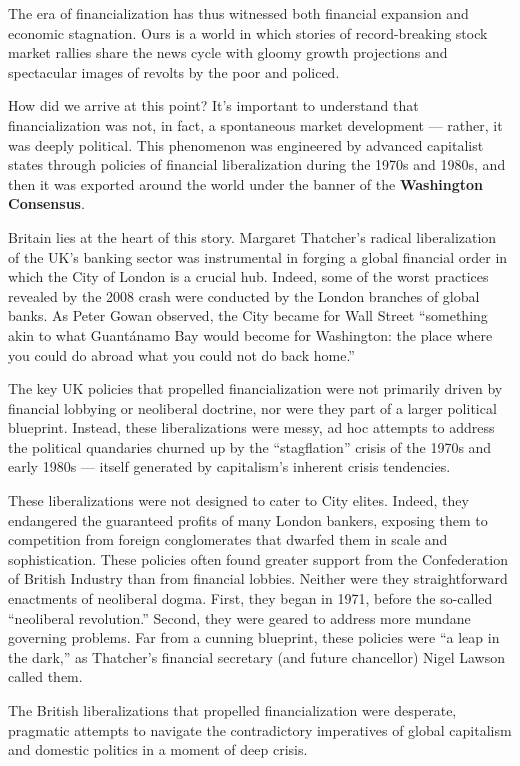 \documentclass[
]{book}
\begin{document}
The era of financialization has thus witnessed both financial expansion and economic stagnation. Ours is a world in which stories of record-breaking stock market rallies share the news cycle with gloomy growth projections and spectacular images of revolts by the poor and policed.

How did we arrive at this point? It's important to understand that financialization was not, in fact, a spontaneous market development --- rather, it was deeply political. This phenomenon was engineered by advanced capitalist states through policies of financial liberalization during the 1970s and 1980s, and then it was exported around the world under the banner of the \textbf{Washington Consensus}.

Britain lies at the heart of this story. Margaret Thatcher's radical liberalization of the UK's banking sector was instrumental in forging a global financial order in which the City of London is a crucial hub. Indeed, some of the worst practices revealed by the 2008 crash were conducted by the London branches of global banks. As Peter Gowan observed, the City became for Wall Street ``something akin to what Guantánamo Bay would become for Washington: the place where you could do abroad what you could not do back home.''

The key UK policies that propelled financialization were not primarily driven by financial lobbying or neoliberal doctrine, nor were they part of a larger political blueprint. Instead, these liberalizations were messy, ad hoc attempts to address the political quandaries churned up by the ``stagflation'' crisis of the 1970s and early 1980s --- itself generated by capitalism's inherent crisis tendencies.

These liberalizations were not designed to cater to City elites. Indeed, they endangered the guaranteed profits of many London bankers, exposing them to competition from foreign conglomerates that dwarfed them in scale and sophistication. These policies often found greater support from the Confederation of British Industry than from financial lobbies. Neither were they straightforward enactments of neoliberal dogma. First, they began in 1971, before the so-called ``neoliberal revolution.'' Second, they were geared to address more mundane governing problems. Far from a cunning blueprint, these policies were ``a leap in the dark,'' as Thatcher's financial secretary (and future chancellor) Nigel Lawson called them.

The British liberalizations that propelled financialization were desperate, pragmatic attempts to navigate the contradictory imperatives of global capitalism and domestic politics in a moment of deep crisis.
\end{document}
